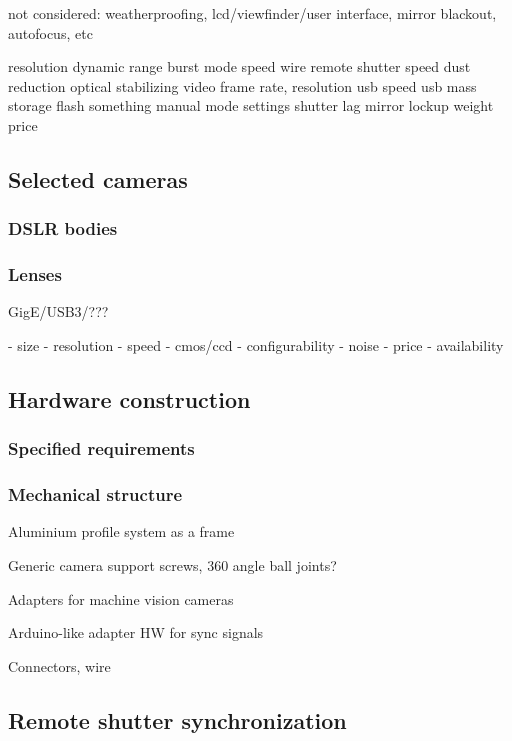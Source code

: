 not considered: weatherproofing, lcd/viewfinder/user interface, mirror blackout, autofocus, etc

resolution
dynamic range
burst mode speed
wire remote shutter speed
dust reduction
optical stabilizing
video frame rate, resolution
usb speed
usb mass storage
flash something
manual mode settings
shutter lag
mirror lockup
weight
price


\subsection{Selected cameras} %

\subsubsection{DSLR bodies}

\subsubsection{Lenses}
GigE/USB3/???

- size
- resolution
- speed
- cmos/ccd
- configurability
- noise
- price
- availability


\subsection{Hardware construction} %

\subsubsection{Specified requirements}

\subsubsection{Mechanical structure}

Aluminium profile system as a frame

Generic camera support screws, 360 angle ball joints?

Adapters for machine vision cameras

Arduino-like adapter HW for sync signals

Connectors, wire


\subsection{Remote shutter synchronization}

